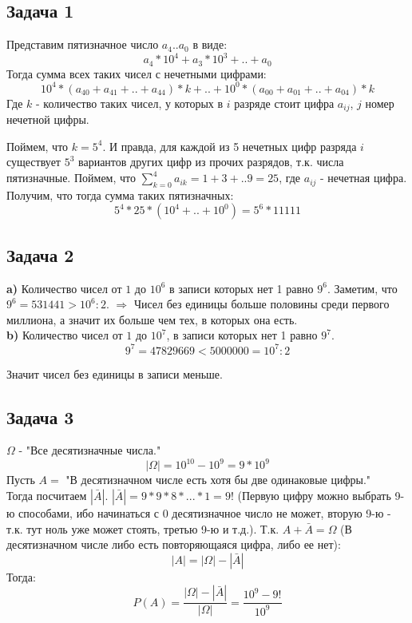 \documentclass{article}
\begin{document}
\begin{center}
	\subsection*{Задача 1}
\end{center}
Представим пятизначное число $ a_4 .. a_0 $ в виде:
	 $$ a_4 * 10^4 + a_3 * 10^3 + .. + a_0 $$
Тогда сумма всех таких чисел с нечетными цифрами:
 $$ 10^4 * (a_{40} + a_{41} + .. + a_{44}) * k + .. + 10^0 * (a_{00} + a_{01} + .. + a_{04}) * k $$ 
Где $ k $ - количество таких чисел, у которых в $ i $ разряде стоит цифра $ a_{ij} $, $ j $ номер нечетной цифры.  

Поймем, что $ k = 5^4 $. И правда, для каждой из 5 нечетных цифр разряда $ i $ существует $ 5^3 $ вариантов других цифр из прочих разрядов, т.к. числа пятизначные. Поймем, что $ \sum_{k=0}^{4} a_{ik} = 1 + 3 + .. 9 = 25 $, где $ a_{ij} $  - нечетная цифра.
Получим, что тогда сумма таких пятизначных:
$$ 5^4 * 25 * (10 ^ 4 + .. + 10 ^ 0) = 5 ^ 6 * 11111 $$
\begin{center}
	\subsection*{Задача 2}
\end{center} 
\textbf{a)} Количество чисел от $ 1 $ до $ 10^6 $ в записи которых нет 1 равно $ 9 ^ 6 $.
Заметим, что $ 9 ^ 6 = 531441 > 10^6 : 2 $. $\Rightarrow$ Чисел без единицы больше половины среди первого миллиона, а значит их больше чем тех, в которых она есть.
\\
\textbf{b)} Количество чисел от $ 1 $ до $ 10^7 $, в записи которых нет 1 равно $ 9 ^ 7 $.
$$ 9 ^ 7  =  47829669 < 5000000 = 10^7 : 2 $$
\begin{center}
	Значит чисел без единицы в записи меньше.
\end{center}

\begin{center}
	\subsection*{Задача 3}
\end{center} 
$ \Omega $ - "Все десятизначные числа."
$$ |\Omega| = 10^{10} - 10^9 = 9 * 10^9 $$
Пусть $A = $ "В десятизначном числе есть хотя бы две одинаковые цифры."\\
Тогда посчитаем $ |\bar{A}| $. $ |\bar{A}| = 9 * 9 * 8 * ... * 1 = 9! $ (Первую цифру можно выбрать 9-ю способами, ибо начинаться с 0 десятизначное число не может, вторую 9-ю - т.к. тут ноль уже может стоять, третью 9-ю и т.д.). Т.к. $A + \bar{A} = \Omega$ (В десятизначном числе либо есть повторяющаяся цифра, либо ее нет):
$$ |A| = |\Omega| - |\bar{A}|$$
Тогда: $$ P(A) = \frac{|\Omega| - |\bar{A}|}{|\Omega|} = \frac{10^9 - 9!}{10^9} $$
\end{document}
